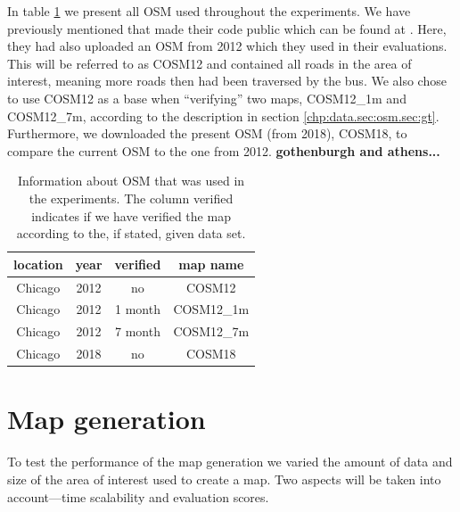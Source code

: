 In table \ref{tab:osm_exp_setup} we present all \ac{OSM} used throughout the experiments. We have previously mentioned that \cite{biagioni:gis12} made their code public which can be found at \citep{chicago}. Here, they had also uploaded an \ac{OSM} from 2012 which they used in their evaluations. This will be referred to as COSM12 and contained all roads in the area of interest, meaning more roads then had been traversed by the bus. We also chose to use COSM12 as a base when ``verifying'' two maps, COSM12\_1m and COSM12\_7m, according to the description in section \ref{chp:data.sec:osm.sec:gt}. Furthermore, we downloaded the present \ac{OSM} (from 2018), COSM18, to compare the current \ac{OSM} to the one from 2012. \textbf{gothenburgh and athens...}


\begin{table}[H]
\centering
\caption{Information about \ac{OSM} that was used in the experiments. The column verified indicates if we have verified the map according to the, if stated, given data set.}
\label{tab:osm_exp_setup}
\begin{tabular}{cccc}
location   & year & verified         & map name            \\ \hline
Chicago    & 2012 & no               & COSM12              \\
Chicago    & 2012 & 1 month          & COSM12\_1m \\ %
Chicago    & 2012 & 7 month          & COSM12\_7m \\ %
Chicago    & 2018 & no               & COSM18              \\ \hline
\end{tabular}
\end{table}


\section{Map generation}
\label{chp:experimental_setup.sec:mapgen}

To test the performance of the map generation we varied the amount of data and size of the area of interest used to create a map. Two aspects will be taken into account---time scalability and evaluation scores. 

